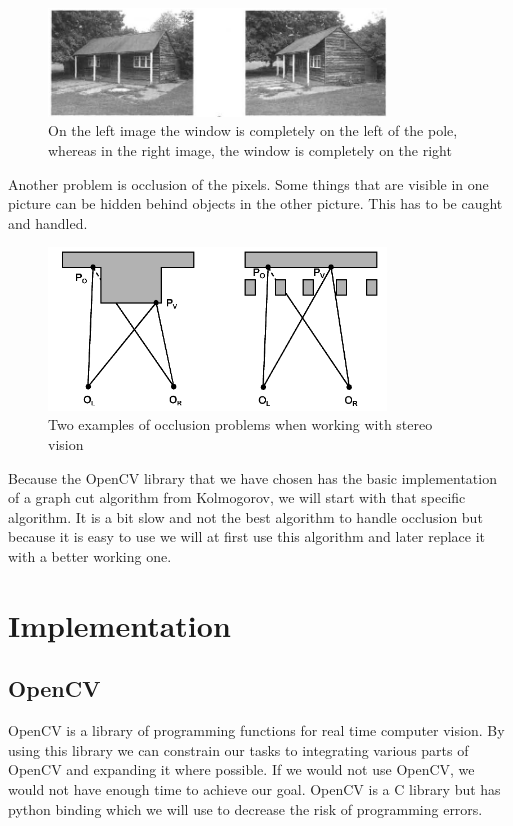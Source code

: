 \documentclass[a4paper]{article}
\begin{document}
\begin{figure}
\centering
\includegraphics[width=0.8\textwidth]{matching_problems_direction}  
\caption{On the left image the window is completely on the left of the pole,
whereas in the right image, the window is completely on the right}
\end{figure}

Another problem is occlusion of the pixels. Some things that are
visible in one picture can be hidden behind objects in the other
picture. This has to be caught and handled.

\begin{figure}
\centering
\includegraphics[width=0.8\textwidth]{matching_problems_occlusion}
\caption{Two examples of occlusion problems when working with stereo vision}
\end{figure}

Because the OpenCV library that we have chosen has the basic
implementation of a graph cut algorithm from Kolmogorov, we will start with
that specific algorithm.
It is a bit slow and not the best algorithm to handle occlusion but because it is
easy to use we will at first use this algorithm and later replace it
with a better working one.

\section{Implementation}

\subsection{OpenCV}
\label{opencv}
OpenCV is a library of programming functions for real time computer vision. By using this library we can constrain our tasks to integrating various parts of OpenCV and expanding it where possible. If we would not use OpenCV, we would not have enough time to achieve our goal. OpenCV is a C library but has python binding which we will use to decrease the risk of programming errors.
\end{document}
